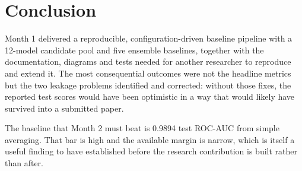 \documentclass[11pt,a4paper]{article}
\begin{document}
\section{Conclusion}

Month 1 delivered a reproducible, configuration-driven baseline pipeline with a
12-model candidate pool and five ensemble baselines, together with the
documentation, diagrams and tests needed for another researcher to reproduce and
extend it. The most consequential outcomes were not the headline metrics but the
two leakage problems identified and corrected: without those fixes, the reported
test scores would have been optimistic in a way that would likely have survived
into a submitted paper.

The baseline that Month 2 must beat is 0.9894 test ROC-AUC from simple
averaging. That bar is high and the available margin is narrow, which is itself
a useful finding to have established before the research contribution is built
rather than after.
\end{document}
